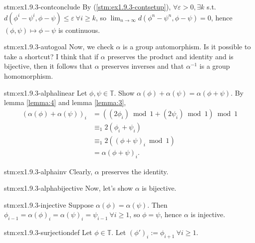 \begin{statement}{stm:ex1.9.3-contconclude}
By (\ref{stm:ex1.9.3-contsetup}), $\forall \varepsilon > 0, \exists k$ s.t. $d(\phi^i - \psi^i, \phi - \psi) \le \varepsilon \ \forall i \ge k$, so $\lim_{n \to \infty} d(\phi^n - \psi^n, \phi - \psi) = 0$, hence $(\phi, \psi) \mapsto \phi - \psi$ is continuous.
\end{statement}

\begin{explanation}{stm:ex1.9.3-autogoal}
Now, we check $\alpha$ is a group automorphism. Is it possible to take a shortcut? I think that if $\alpha$ preserves the product and identity and is bijective, then it follows that $\alpha$ preserves inverses and that $\alpha^{-1}$ is a group homomorphism.
\end{explanation}

\begin{statement}{stm:ex1.9.3-alphalinear}
    Let $\phi, \psi \in \mathbb{T}$. Show $\alpha(\phi) + \alpha(\psi) = \alpha(\phi + \psi)$. By lemma \ref{lemma:4} and lemma \ref{lemma:3},
    \begin{align*}
    (\alpha(\phi) + \alpha(\psi))_i 
    &= \left((2\phi_i) \bmod 1 + (2\psi_i) \bmod 1\right) \bmod 1 \\
    &\equiv_1 2(\phi_i + \psi_i) \\
    &\equiv_1 2\left((\phi + \psi)_i \bmod 1\right) \\
    &= \alpha(\phi + \psi)_i.
    \end{align*}
\end{statement}

\begin{statement}{stm:ex1.9.3-alphainv}
Clearly, $\alpha$ preserves the identity.
\end{statement}

\begin{explanation}{stm:ex1.9.3-alphabijective}
Now, let’s show $\alpha$ is bijective.
\end{explanation}

\begin{statement}{stm:ex1.9.3-injective}
Suppose $\alpha(\phi) = \alpha(\psi)$. Then $\phi_{i-1} = \alpha(\phi)_i = \alpha(\psi)_i = \psi_{i-1} \ \forall i \ge 1$, so $\phi = \psi$, hence $\alpha$ is injective.
\end{statement}

\begin{statement}{stm:ex1.9.3-surjectiondef}
Let $\phi \in \mathbb{T}$. Let $(\phi')_i := \phi_{i+1} \ \forall i \ge 1$.
\end{statement}

